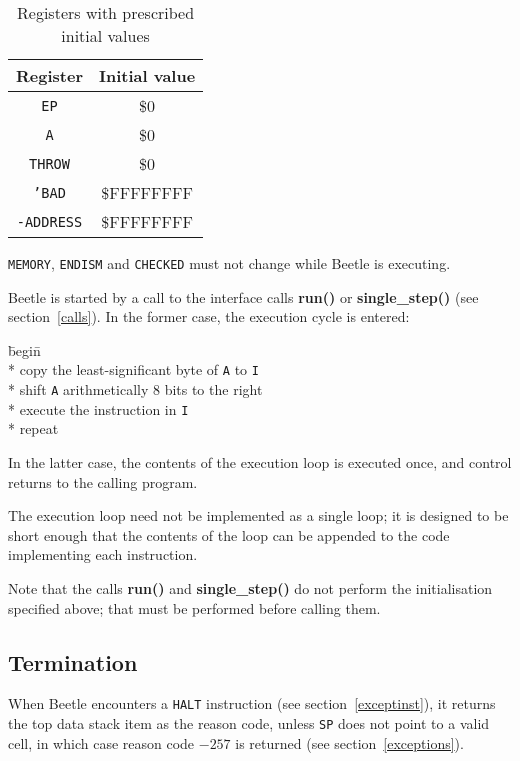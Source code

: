 \documentclass{article}
\begin{document}
\begin{table}[htbp]
\begin{center}
\begin{tabular}{cc} \toprule
\bf Register & \bf Initial value \\ \midrule
{\tt EP} & \$0 \\
{\tt A} & \$0 \\
{\tt THROW} & \$0 \\
{\tt 'BAD} & {\$FFFFFFFF} \\
{\tt -ADDRESS} & {\$FFFFFFFF} \\ \bottomrule
\end{tabular}
\caption{\label{inittable}Registers with prescribed initial values}
\end{center}
\end{table}

{\tt MEMORY}, {\tt ENDISM} and {\tt CHECKED} must not change while Beetle is executing.

Beetle is started by a call to the interface calls {\bf run()} or {\bf
single\_step()} (see section~\ref{calls}). In the former case, the execution
cycle is entered:

\begin{tabbing}
\hspace{0.5in}\=begin\=\+\+ \\*
copy the least-significant byte of {\tt A} to {\tt I} \\*
shift {\tt A} arithmetically 8 bits to the right \\*
execute the instruction in {\tt I} \- \\*
repeat
\end{tabbing}

In the latter case, the contents of the execution loop is executed once, and
control returns to the calling program.

The execution loop need not be implemented as a single loop; it  is designed to
be short enough that the contents of the loop can be appended  to the code
implementing each instruction.

Note that the calls {\bf run()} and {\bf single\_step()} do not perform the
initialisation specified above; that must be performed before calling them.


\subsection{Termination}

When Beetle encounters a {\tt HALT} instruction (see section~\ref{exceptinst}),
it returns the top data stack item as the reason code, unless {\tt SP} does not
point to a valid cell, in which case reason code $-257$ is returned (see section~\ref{exceptions}).
\end{document}
